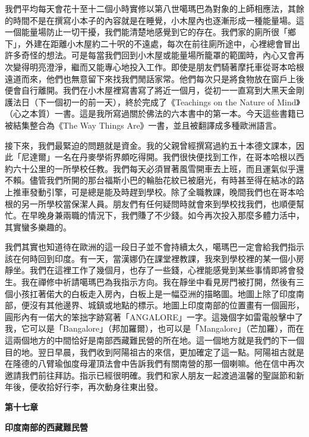 我們平均每天會花十至十二個小時實修以第八世噶瑪巴為對象的上師相應法，其餘的時間不是在撰寫小本子的內容就是在睡覺，小木屋內也逐漸形成一種能量場。這一個能量場防止一切干擾，我們能清楚地感覺到它的存在。我們家的廁所很「鄉下」，外建在距離小木屋約二十呎的不遠處，每次在前往廁所途中，心裡總會冒出許多奇怪的想法。可是每當我們回到小木屋或能量場所籠罩的範圍時，內心又會再次變得明亮澄淨，繼而又能專心地投入工作。即使是朋友們騎著摩托車從哥本哈根遠道而來，他們也無意留下來找我們閒話家常。他們每次只是將食物放在窗戶上後便會自行離開。我們在小木屋裡寫書寫了將近一個月，從初一一直寫到大黑天金剛護法日（下一個初一的前一天），終於完成了《Teachings
on the Nature of
Mind》（心之本質）一書。這是我所寫過關於佛法的六本書中的第一本。今天這些書籍已被結集整合為《The
Way Things Are》一書，並且被翻譯成多種歐洲語言。

接下來，我們最緊迫的問題就是資金。我的父親曾經撰寫過約五十本德文課本，因此「尼達爾」一名在丹麥學術界頗吃得開。我們很快便找到工作，在哥本哈根以西約六十公里的一所學校任教。我們每天必須冒著風雪開車去上班，而且運氣似乎還不賴。儘管我們所開的那台福斯小巴的輪胎花紋已被磨光，有時甚至得在結冰的路上推車發動引擎，可是總是能及時趕到學校。除了全職教課，晚間我們也在哥本哈根的另一所學校當保潔人員。朋友們有任何疑問時就會來到學校找我們，也順便幫忙。在早晚身兼兩職的情況下，我們賺了不少錢。如今再次投入那麼多體力活中，其實蠻多樂趣的。

我們其實也知道待在歐洲的這一段日子並不會持續太久，噶瑪巴一定會給我們指示該在何時回到印度。有一天，當漢娜仍在課堂裡教課，我來到學校裡的某一個小房靜坐。我們在這裡工作了幾個月，也存了一些錢，心裡能感覺到某些事情即將會發生。我在禪修中祈請噶瑪巴為我指示方向。我在靜坐中看見房門被打開，然後有三個小孩扛著偌大的白板走入房內，白板上是一幅亞洲的描略圖。地圖上除了印度南部，便沒有其他邊界、城鎮或地點的標示。地圖上印度南部的位置畫有一個圓形，圓形內有一偌大的笨拙字跡寫著「ANGALORE」一字。這幾個字如雷電般擊中了我，它可以是「Bangalore」（邦加羅爾），也可以是「Mangalore」（芒加羅），而在這兩個地方的中間恰好是南部西藏難民營的所在地。這一個地方就是我們的下一個目的地。翌日早晨，我們收到阿陽祖古的來信，更加確定了這一點。阿陽祖古就是在隆德的八臂瑜伽度母灌頂法會中告訴我們有關南營的那一個喇嘛。他在信中再次邀請我們前往拜訪。指示已經很明確。我們和家人朋友一起渡過溫馨的聖誕節和新年後，便收拾好行李，再次動身往東出發。

\textbf{第十七章}

\textbf{印度南部的西藏難民營}

